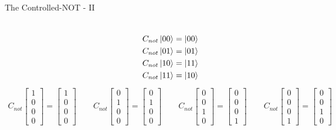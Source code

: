 \documentclass{beamer}
\begin{document}
\begin{frame}{The Controlled-NOT - II}
  {\tiny
    \begin{columns}[t]
    \begin{align*}
      C_{not}\ket{00} &= \ket{00} \\
      C_{not}\ket{01} &= \ket{01} \\
      C_{not}\ket{10} &= \ket{11} \\
      C_{not}\ket{11} &= \ket{10}
    \end{align*}
    \begin{align*}
      C_{not} \begin{bmatrix} 1 \\ 0 \\ 0 \\ 0 \end{bmatrix} = \begin{bmatrix} 1 \\ 0 \\ 0 \\ 0 \end{bmatrix}
      \qquad
      C_{not} \begin{bmatrix} 0 \\ 1 \\ 0 \\ 0 \end{bmatrix} = \begin{bmatrix} 0 \\ 1 \\ 0 \\ 0 \end{bmatrix}
      \qquad
      C_{not} \begin{bmatrix} 0 \\ 0 \\ 1 \\ 0 \end{bmatrix} = \begin{bmatrix} 0 \\ 0 \\ 0 \\ 1 \end{bmatrix}
      \qquad
      C_{not} \begin{bmatrix} 0 \\ 0 \\ 0 \\ 1 \end{bmatrix} = \begin{bmatrix} 0 \\ 0 \\ 1 \\ 0 \end{bmatrix}

\end{align*}
\end{columns}}
\end{frame}
\end{document}
